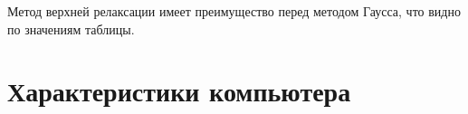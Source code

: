 \documentclass[bachelor, och, referat]{SCWorks}
\begin{document}
\begin{figure}[h]
\end{figure}

Метод верхней релаксации имеет преимущество перед методом Гаусса, что видно по значениям таблицы.



\section{Характеристики компьютера}
\begin{figure}[h]
\end{figure}
\begin{figure}[h]
\end{figure}

\end{document}
